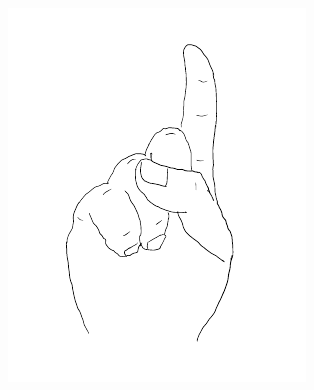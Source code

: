 \documentclass[12pt, a4paper, oneside]{ctexart}
\begin{document}
\begin{figure}[H]
{\begin{minipage}[t]{0.33\linewidth}
    \includegraphics[width=\linewidth]{fig/unmarked1.pdf}
    \end{minipage}%
    \label{fig:unmarked1}%
    }%
\end{figure}
\end{document}
